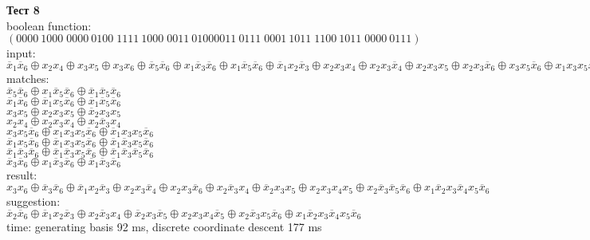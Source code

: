 \documentclass[a4paper,12pt,titlepage,finall]{article}
\begin{document}
\textbf{Тест 8}
\\boolean function: $$(0000\:1000\;0000\:0100\;1111\:1000\;0011\:01000011\:0111\;0001\:1011\;1100\:1011\;0000\:0111)$$
input: $\overline x_1 \overline x_6 \oplus x_2 x_4 \oplus x_3 x_5 \oplus x_3 x_6 \oplus \overline x_5 \overline x_6 \oplus x_1 \overline x_3 \overline x_6 \oplus x_1 \overline x_5 \overline x_6 \oplus \overline x_1 x_2 \overline x_3 \oplus x_2 x_3 x_4 \oplus x_2 x_3 \overline x_4 \oplus x_2 x_3 x_5 \oplus x_2 x_3 \overline x_6 \oplus x_3 x_5 \overline x_6 \oplus x_1 x_3 x_5 \overline x_6 \oplus \overline x_1 \overline x_3 \overline x_5 \overline x_6 \oplus x_2 x_3 x_4 x_5 \oplus x_2 \overline x_3 \overline x_5 \overline x_6 \oplus x_1 \overline x_2 x_3 \overline x_4 x_5 \overline x_6$
\\matches:
\\$\overline x_5 \overline x_6 \oplus x_1 \overline x_5 \overline x_6 \oplus \overline x_1 \overline x_5 \overline x_6$
\\$\overline x_1 \overline x_6 \oplus \overline x_1 x_5 \overline x_6 \oplus \overline x_1 \overline x_5 \overline x_6$
\\$x_3 x_5 \oplus x_2 x_3 x_5 \oplus \overline x_2 x_3 x_5$
\\$x_2 x_4 \oplus x_2 x_3 x_4 \oplus x_2 \overline x_3 x_4$
\\$x_3 x_5 \overline x_6 \oplus x_1 x_3 x_5 \overline x_6 \oplus \overline x_1 x_3 x_5 \overline x_6$
\\$\overline x_1 x_5 \overline x_6 \oplus \overline x_1 x_3 x_5 \overline x_6 \oplus \overline x_1 \overline x_3 x_5 \overline x_6$
\\$\overline x_1 \overline x_3 \overline x_6 \oplus \overline x_1 \overline x_3 x_5 \overline x_6 \oplus \overline x_1 \overline x_3 \overline x_5 \overline x_6$
\\$\overline x_3 \overline x_6 \oplus x_1 \overline x_3 \overline x_6 \oplus \overline x_1 \overline x_3 \overline x_6$
\\result: $x_3 x_6 \oplus \overline x_3 \overline x_6 \oplus \overline x_1 x_2 \overline x_3 \oplus x_2 x_3 \overline x_4 \oplus x_2 x_3 \overline x_6 \oplus x_2 \overline x_3 x_4 \oplus \overline x_2 x_3 x_5 \oplus x_2 x_3 x_4 x_5 \oplus x_2 \overline x_3 \overline x_5 \overline x_6 \oplus x_1 \overline x_2 x_3 \overline x_4 x_5 \overline x_6$
\\suggestion: $\overline x_2 \overline x_6 \oplus \overline x_1 x_2 \overline x_3 \oplus x_2 \overline x_3 x_4 \oplus \overline x_2 x_3 \overline x_5 \oplus x_2 x_3 x_4 \overline x_5 \oplus x_2 \overline x_3 x_5 \overline x_6 \oplus x_1 \overline x_2 x_3 \overline x_4 x_5 \overline x_6$
\\time: generating basis 92 ms, discrete coordinate descent 177 ms
\end{document}
